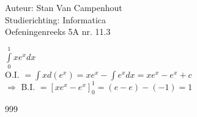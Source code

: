 \documentclass[a4paper]{article}
\begin{document}
  
\noindent \large Auteur: Stan Van Campenhout \\
\noindent \large Studierichting:  Informatica\\
\noindent \large Oefeningenreeks 5A nr. 11.3\\

\medskip

\normalsize

$ \displaystyle\int\limits_0^1xe^x dx $\\

O.I. $ = \displaystyle\int xd\left(e^x\right) = xe^x-\displaystyle\int e^xdx = xe^x-e^x + c $\\

$ \Rightarrow $ B.I. $ = \left[xe^x-e^x\right]_0^1 = \left(e-e\right) - \left(-1\right) = 1 $\\

\begin{thebibliography}{999}
\end{thebibliography}
\end{document}

